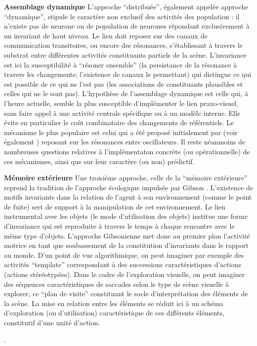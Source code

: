 \documentclass[11pt]{article}
\begin{document}
{{\bf Assemblage dynamique} L'approche ``distribuée'', également appelée approche ``dynamique'', stipule
le caractère non exclusif des activités des population : il n'existe pas de
neurone ou de population de neurones répondant exclusivement à un invariant 
de haut niveau. Le lien doit reposer sur des
canaux de communication transitoires, ou encore des résonances, s'établissant à travers le
substrat entre différentes activités constituants partiels de la scène.
L'invariance est ici la susceptibilité à ``résoner ensemble'' (la persistance de la résonance à 
travers les changements; l'existence de canaux le permettant)
qui distingue ce qui est possible de ce qui ne l'est pas (les associations de constituants
plausibles et celles qui ne le sont pas).
L'hypothèse de l'assemblage dynamique est celle qui, à l'heure actuelle, semble la plus susceptible
d'implémenter le lien praxo-visuel, sans faire appel à une activité centrale spécifique ou
à un modèle interne. Elle évite en particulier le coût combinatoire des changements de
référentiels. Le mécanisme le plus populaire est celui qui a été proposé initialement
par  (voir également ) 
reposant sur les résonances entre oscillateurs. Il reste néanmoins
de nombreuses questions relatives à l'implémentaton concrète (ou opérationnelle) de ces mécanismes,
ainsi que sur leur caractère (ou non) prédictif. 

{\bf Mémoire extérieure}	Une troisième approche, celle de la ``mémoire extérieure'' \cite{ORe01}
reprend la tradition 
de l'approche écologique impulsée par Gibson \cite{Gib79}. L'existence de 
motifs invariants dans la relation de l'agent à son environnement (comme le point de fuite)
sert de support à la manipulation de cet environnement.
Le lien instrumental avec les objets (le mode d'utilisation des objets)
institue une forme d'invariance  qui est reproduite à travers le temps à chaque rencontre
avec le même type d'objets.
L'approche Gibsonienne met donc au premier plan l'activité motrice en tant que soubassement
de la constitution d'invariants dans le rapport au monde.
D'un point de vue algorithmique, on peut imaginer par exemple des activités ``template'' 
correspondant à des successions caractéristiques d'actions (actions stéréotypées).
Dans le cadre de l'exploration visuelle, on peut imaginer des séquences caractéristiques
de saccades selon le type de scène visuelle à explorer,
ce ``plan de visite''
constituant le socle d'interprétation des éléments de la scène.
La mise en relation entre les éléments se réduit ici à un schéma d'exploration (ou d'utilisation) 
caractéristique de ces différents éléments, constitutif d'une unité d'action. 
}.
\end{document}
